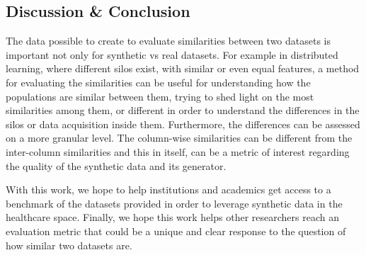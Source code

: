 \subsection{Discussion \& Conclusion}

The data possible to create to evaluate similarities between two datasets is important not only for synthetic vs real datasets. For example in distributed learning, where different silos exist, with similar or even equal features, a method for evaluating the similarities can be useful for understanding how the populations are similar between them, trying to shed light on the most similarities among them, or different in order to understand the differences in the silos or data acquisition inside them.
Furthermore, the differences can be assessed on a more granular level. The column-wise similarities can be different from the inter-column similarities and this in itself, can be a metric of interest regarding the quality of the synthetic data and its generator.

With this work, we hope to help institutions and academics get access to a benchmark of the datasets provided in order to leverage synthetic data in the healthcare space. Finally, we hope this work helps other researchers reach an evaluation metric that could be a unique and clear response to the question of how similar two datasets are.
